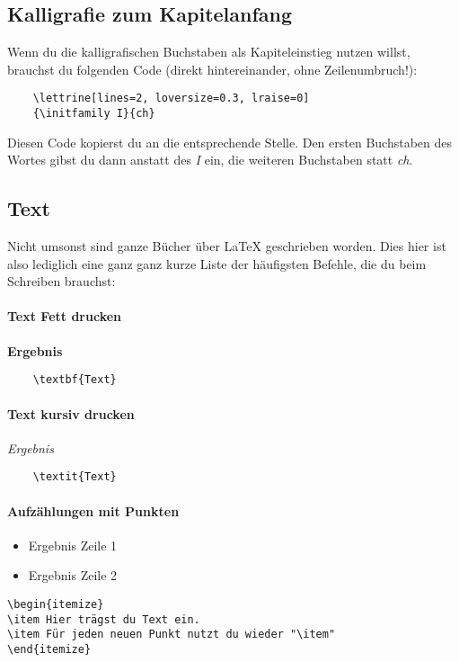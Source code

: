 \subsection{Kalligrafie zum Kapitelanfang}

Wenn du die kalligrafischen Buchstaben als Kapiteleinstieg nutzen willst, brauchst du folgenden Code (direkt hintereinander, ohne Zeilenumbruch!):

\begin{verbatim}
    \lettrine[lines=2, loversize=0.3, lraise=0]
    {\initfamily I}{ch}
\end{verbatim}

Diesen Code kopierst du an die entsprechende Stelle. Den ersten Buchstaben des Wortes gibst du dann anstatt des \emph{I} ein, die weiteren Buchstaben statt \emph{ch}.

\subsection{Text}
Nicht umsonst sind ganze Bücher über \LaTeX{} geschrieben worden. Dies hier ist also lediglich eine ganz ganz kurze Liste der häufigsten Befehle, die du beim Schreiben brauchst:




\paragraph{Text Fett drucken} \textbf{Ergebnis}
\begin{verbatim}
    \textbf{Text} \end{verbatim}
\paragraph{Text kursiv drucken} \textit{Ergebnis} \begin{verbatim}
    \textit{Text} \end{verbatim}
\paragraph{Aufzählungen mit Punkten}  \begin{itemize}
        \item Ergebnis Zeile 1
        \item Ergebnis Zeile 2
    \end{itemize}
    \begin{verbatim}\begin{itemize}
\item Hier trägst du Text ein.
\item Für jeden neuen Punkt nutzt du wieder "\item"
\end{itemize}    \end{verbatim}

